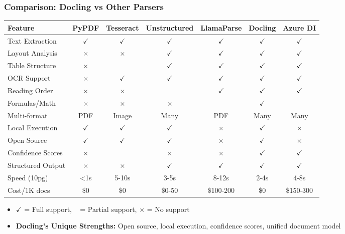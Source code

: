 \begin{frame}[fragile]\frametitle{Comparison: Docling vs Other Parsers}

\begin{table}[h]
\centering
\tiny
\begin{tabular}{|l|c|c|c|c|c|c|}
\hline
\textbf{Feature} & \textbf{PyPDF} & \textbf{Tesseract} & \textbf{Unstructured} & \textbf{LlamaParse} & \textbf{Docling} & \textbf{Azure DI} \\
\hline
Text Extraction & $\checkmark$ & $\checkmark$ & $\checkmark$ & $\checkmark$ & $\checkmark$ & $\checkmark$ \\
\hline
Layout Analysis & $ \times $ & $ \times $ & $\checkmark$ & $\checkmark$ & $\checkmark$ & $\checkmark$ \\
\hline
Table Structure & $ \times $ & ~ & $\checkmark$ & $\checkmark$ & $\checkmark$ & $\checkmark$ \\
\hline
OCR Support & $ \times $ & $\checkmark$ & $\checkmark$ & $\checkmark$ & $\checkmark$ & $\checkmark$ \\
\hline
Reading Order & $ \times $ & $ \times $ & ~ & $\checkmark$ & $\checkmark$ & $\checkmark$ \\
\hline
Formulas/Math & $ \times $ & $ \times $ & $ \times $ & ~ & $\checkmark$ & ~ \\
\hline
Multi-format & PDF & Image & Many & PDF & Many & Many \\
\hline
Local Execution & $\checkmark$ & $\checkmark$ & $\checkmark$ & $ \times $ & $\checkmark$ & $ \times $ \\
\hline
Open Source & $\checkmark$ & $\checkmark$ & $\checkmark$ & $ \times $ & $\checkmark$ & $ \times $ \\
\hline
Confidence Scores & $ \times $ & ~ & $ \times $ & $ \times $ & $\checkmark$ & $\checkmark$ \\
\hline
Structured Output & $ \times $ & $ \times $ & $\checkmark$ & $\checkmark$ & $\checkmark$ & $\checkmark$ \\
\hline
Speed (10pg) & <1s & 5-10s & 3-5s & 8-12s & 2-4s & 4-8s \\
\hline
Cost/1K docs & \$0 & \$0 & \$0-50 & \$100-200 & \$0 & \$150-300 \\
\hline
\end{tabular}
\end{table}

      \begin{itemize}
        \item $\checkmark$ = Full support, ~ = Partial support, $ \times $ = No support
        \item \textbf{Docling's Unique Strengths:} Open source, local execution, confidence scores, unified document model
      \end{itemize}
\end{frame}

